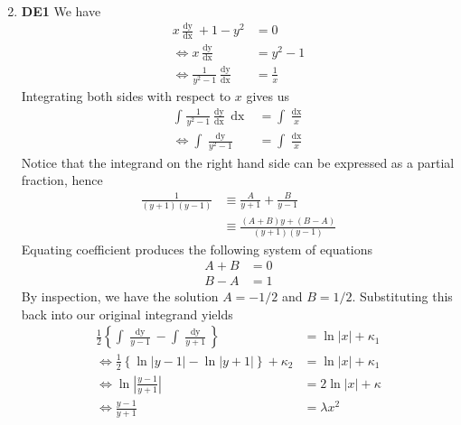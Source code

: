 \documentclass[12pt,oneside]{book}
\begin{document}
\begin{enumerate}
\begin{enumerate}
\begin{align*}
            \end{align*}
        \end{enumerate}
        \item \textbf{DE1} We have \begin{align*}
            x \frac{\mathop{\mathrm{d}y}}{\mathop{\mathrm{d}x}} + 1 - y^2 &= 0 \\
            \iff x \frac{\mathop{\mathrm{d}y}}{\mathop{\mathrm{d}x}} &= y^2 - 1 \\
            \iff \frac{1}{y^2 - 1} \frac{\mathop{\mathrm{d}y}}{\mathop{\mathrm{d}x}} &= \frac{1}{x}
        \end{align*}
        Integrating both sides with respect to $x$ gives us \begin{align*}
            \int_{}^{} \frac{1}{y^2 - 1} \frac{\mathop{\mathrm{d}y}}{\mathop{\mathrm{d}x}} \mathop{\mathrm{d}x} &= \int_{}^{} \frac{\mathop{\mathrm{d}x} }{x} \\
            \iff \int_{}^{} \frac{\mathop{\mathrm{d}y} }{y^2 - 1} &= \int_{}^{} \frac{\mathop{\mathrm{d}x} }{x}    
        \end{align*}
        Notice that the integrand on the right hand side can be expressed as a partial fraction, hence \begin{align*}
            \frac{1}{(y + 1)(y - 1)} &\equiv \frac{A}{y + 1} + \frac{B}{y - 1} \\
            &\equiv \frac{(A + B)y + (B - A)}{(y + 1) (y - 1)}
        \end{align*}
        Equating coefficient produces the following system of equations \begin{align*}
            A + B &= 0 \\
            B - A &= 1
        \end{align*}
        By inspection, we have the solution $A = -1/2$ and $B = 1/2$. Substituting this back into our original integrand yields \begin{align*}
            \frac{1}{2} \left\{ \int_{}^{} \frac{\mathop{\mathrm{d}y} }{y - 1} - \int_{}^{} \frac{\mathop{\mathrm{d}y} }{y + 1}   \right\}  &= \ln \left| x \right| + \kappa_1 \\
            \iff \frac{1}{2} \left\{ \ln \left| y - 1 \right| - \ln \left| y + 1 \right| \right \} + \kappa_2 &= \ln \left| x \right| + \kappa_1 \\
            \iff \ln \left| \frac{y - 1}{y + 1} \right| &= 2 \ln \left| x \right| + \kappa \\
            \iff \frac{y-1}{y+1} &= \lambda x^2

\end{align*}
\end{enumerate}
\end{document}
